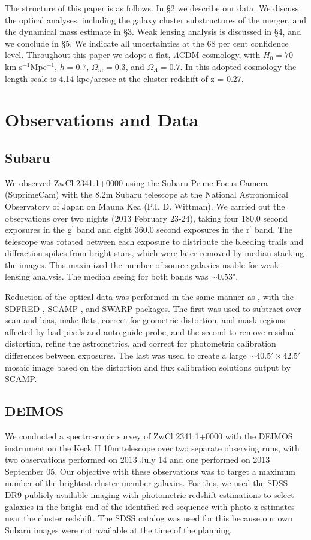 \documentclass[onecolumn]{aastex}
\begin{document}
The structure of this paper is as follows.  In \S 2 we describe our data.  We discuss the optical analyses, including the galaxy cluster substructures of the merger, and the dynamical mass estimate in \S 3.  Weak lensing analysis is discussed in \S 4, and we conclude in \S 5.  We indicate all uncertainties at the 68 per cent confidence level.  Throughout this paper we adopt a flat, $\Lambda$CDM cosmology, with $H_0 = 70$ km s$^{-1}$Mpc$^{-1}$, $h = 0.7$, $\Omega_m = 0.3$, and $\Omega_\Lambda = 0.7$.  In this adopted cosmology the length scale is 4.14 kpc/arcsec at the cluster redshift of z = 0.27.

\section[]{Observations and Data}

\subsection{Subaru}
We observed ZwCl 2341.1+0000 using the Subaru Prime Focus Camera (SuprimeCam) with the 8.2m Subaru telescope at the National Astronomical Observatory of Japan on Mauna Kea (P.I. D. Wittman).  We carried out the observations over two nights (2013 February 23-24), taking four 180.0 second exposures in the g$^{\prime}$ band and eight 360.0 second exposures in the r$^{\prime}$ band.  The telescope was rotated between each exposure to distribute the bleeding trails and diffraction spikes from bright stars, which were later removed by median stacking the images.  This maximized the number of source galaxies usable for weak lensing analysis.  The median seeing for both bands was $\sim0.53$".  

Reduction of the optical data was performed in the same manner as \cite{Jee15, Jee16}, with the SDFRED \citep{Ouchi04, Yagi02}, SCAMP \citep{Bertin06}, and SWARP \citep{Bertin02} packages.  The first was used to subtract over-scan and bias, make flats, correct for geometric distortion, and mask regions affected by bad pixels and auto guide probe, and the second to remove residual distortion, refine the astrometrics, and correct for photometric calibration differences between exposures.  The last was used to create a large $\sim 40.5' \times 42.5'$ mosaic image based on the distortion and flux calibration solutions output by SCAMP.


\subsection{DEIMOS}
We conducted a spectroscopic survey of ZwCl 2341.1+0000 with the DEIMOS instrument on the Keck II 10m telescope over two separate observing runs, with two observations performed on 2013 July 14 and one performed on 2013 September 05.  Our objective with these observations was to target a maximum number of the brightest cluster member galaxies.  For this, we used the SDSS DR9 \citep{Ahn12} publicly available imaging with photometric redshift estimations to select galaxies in the bright end of the identified red sequence with photo-z estimates near the cluster redshift.  The SDSS catalog was used for this because our own Subaru images were not available at the time of the planning.  
\end{document}
